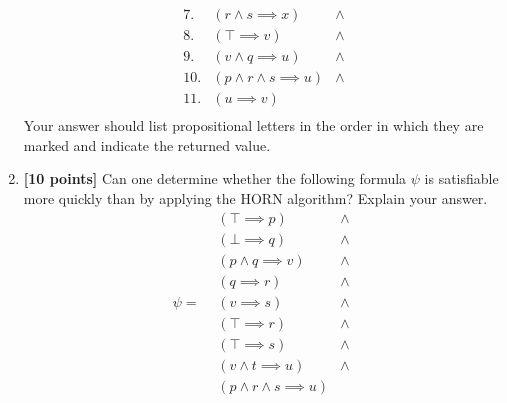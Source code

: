 \documentclass{article}
\begin{document}
\begin{enumerate}
\begin{displaymath}
\begin{array}{|lll}
      7.  & (r \land s \implies x)             & \land \\
      8.  & (\top \implies v)                  & \land \\
      9.  & (v \land q \implies u)             & \land \\
      10. & (p \land r \land s \implies u)     & \land \\
      11. & (u \implies v)                     &       \\
    \end{array}
  \end{displaymath}
  Your answer should list propositional letters in the order in which
  they are marked and indicate the returned value.

  \item \textbf{[10 points]} Can one determine whether the following
    formula $\psi$ is satisfiable more quickly than by
    applying the HORN algorithm?  Explain your answer.
  \begin{displaymath}
    \psi = 
    \begin{array}{|lll}
        & (\top \implies p)                  & \land \\
        & (\bot \implies q)                  & \land \\
        & (p \land q \implies v)             & \land \\
        & (q \implies r)                     & \land \\
        & (v \implies s)                     & \land \\
        & (\top \implies r)                  & \land \\
        & (\top \implies s)                  & \land \\
        & (v \land t \implies u)             & \land \\
        & (p \land r \land s \implies u)     & 
    \end{array}
  \end{displaymath}

\end{enumerate}
\end{document}
